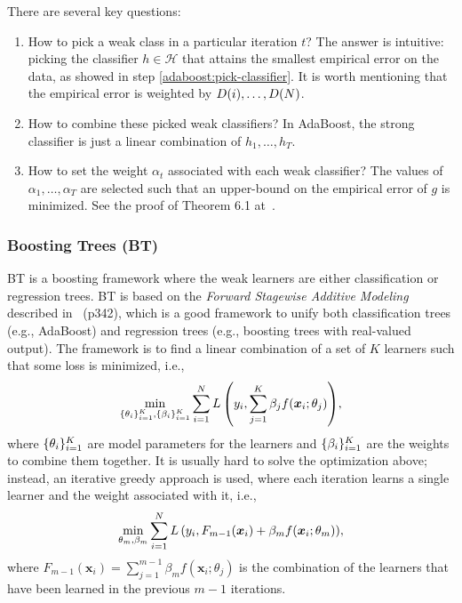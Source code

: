 There are several key questions:
    \begin{enumerate}
        \item How to pick a weak class in a particular iteration $t$? The answer is intuitive: picking the classifier $h \in \mathcal{H}$ that attains the smallest empirical error on the data, as showed in step \ref{adaboost:pick-classifier}.
        It is worth mentioning that the empirical error is weighted by $D(i), \ldots, D(N)$.
        \item How to combine these picked weak classifiers? In AdaBoost, the strong classifier is just a linear combination of $h_1, \ldots, h_T$.
        \item How to set the weight $\alpha_t$ associated with each weak classifier? The values of $\alpha_1, \ldots, \alpha_T$ are selected such that an upper-bound on the empirical error of $g$ is minimized. See the proof of Theorem 6.1 at~\cite{mohri2018foundations}.
    \end{enumerate}

    \subsubsection{Boosting Trees (BT)}\label{sec:boosting-trees}
        BT is a boosting framework where the weak learners are either classification or regression trees.
        BT is based on the \emph{Forward Stagewise Additive Modeling} described in~\cite{hastie2009elements} (p342), which is a good framework to unify both classification trees (e.g., AdaBoost) and regression trees (e.g., boosting trees with real-valued output).
        The framework is to find a linear combination of a set of $K$ learners such that some loss is minimized, i.e., 
            \begin{equation}
                \min_{\{ \theta_i \}_{i=1}^{K}, \{ \beta_i \}_{i=1}^{K} } \sum_{i=1}^{N}{L\left( y_i, \sum_{j=1}^{K}{\beta_j f(\bm{x}_i; \theta_j)} \right)},
            \end{equation}
        where $\{ \theta_i \}_{i=1}^{K}$ are model parameters for the learners and $\{ \beta_i \}_{i=1}^{K}$ are the weights to combine them together.
        It is usually hard to solve the optimization above; instead, an iterative greedy approach is used, where each iteration learns a single learner and the weight associated with it, i.e., 
            \begin{equation}\label{eq:forward-stagewise-add-model}
                \min_{\theta_m, \beta_m} \sum_{i=1}^{N}{
                    L\left( y_i, F_{m-1}(\bm{x}_i) + \beta_m f(\bm{x}_i; \theta_m) \right)
                },
            \end{equation}
        where $F_{m-1}(\bm{x}_i) = \sum_{j=1}^{m-1}{\beta_m f(\bm{x}_i; \theta_j)}$ is the combination of the learners that have been learned in the previous $m-1$ iterations. 
        
